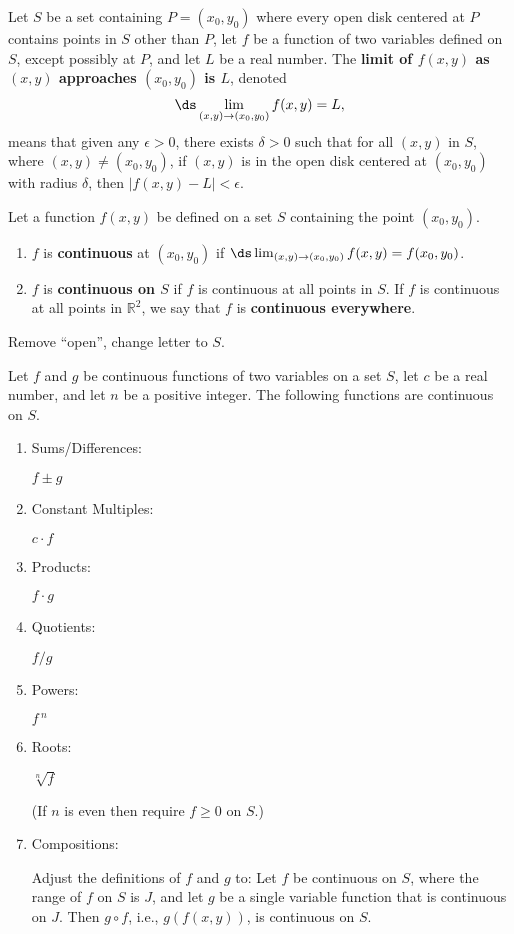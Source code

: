 \documentclass{article}
\begin{document}
{Let $S$ be a set containing $P=(x_0,y_0)$ where every open disk centered at $P$ contains points in $S$ other than $P$, let $f$ be a function of two variables defined on $S$, except possibly at $P$, and let $L$ be a real number. 
The \textbf{limit of $f(x,y)$ as $(x,y)$ approaches $(x_0,y_0)$ is $L$}, denoted $$\ds \lim_{(x,y)\to (x_0,y_0)} f(x,y) = L,$$
means that given any $\epsilon>0$, there exists $\delta>0$ such that for all  $(x,y)$ in $S$, where $(x,y)\neq (x_0,y_0)$, if $(x,y)$ is in the open disk centered at $(x_0,y_0)$ with radius $\delta$, then $|f(x,y) - L|<\epsilon.$
}

{Let a function $f(x,y)$ be defined on a set $S$ containing the point $(x_0,y_0)$. 

\begin{enumerate}
	\item $f$ is \textbf{continuous} at $(x_0,y_0)$ if $\ds\lim_{(x,y)\to(x_0,y_0)} f(x,y) = f(x_0,y_0)$.
	\item	$f$ is \textbf{continuous on $S$} if $f$ is continuous at all points in $S$. If $f$ is continuous at all points in $\mathbb{R}^2$, we say that $f$ is \textbf{continuous everywhere}.
\end{enumerate}
}

Remove ``open'', change letter to $S$.

{Let $f$ and $g$ be continuous functions of two variables on a set  $S$, let $c$ be a real number, and let $n$ be a positive integer. The following functions are continuous on $S$.
		\begin{enumerate}
		\item		\parbox{80pt}{Sums/Differences:}	$f\pm g$
		\item		\parbox{80pt}{Constant Multiples:}	$c\cdot f$
		\item		\parbox{80pt}{Products:}	$f\cdot g$
		\item		\parbox{80pt}{Quotients:}	$f/g$ 
		\item		\parbox{80pt}{Powers:}	$f\,^n$
		\item		\parbox{80pt}{Roots:}	$\sqrt[n]{f}$ \qquad \parbox[t]{150pt}{\small (If $n$ is even then require $f\geq 0$ on $S$.)}
		\item		\parbox{80pt}{Compositions:}\parbox[t]{185pt}{Adjust the definitions of $f$ and $g$ to: Let $f$ be continuous on $S$, where the range of $f$ on $S$ is $J$, and let $g$ be a single variable function that is continuous on $J$. Then $g\circ f$, i.e., $g(f(x,y))$, is continuous on $S$.}
		\end{enumerate}
}
\end{document}
